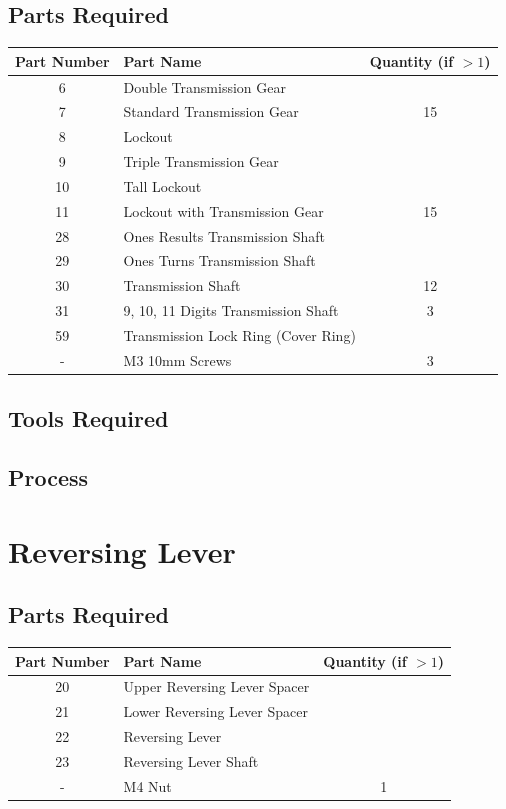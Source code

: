 \documentclass{article}
\begin{document}
\subsection{Parts Required}
\begin{table}[h!]
	\centering
	\begin{tabular}{clc}
		Part Number & Part Name & Quantity (if $>1$) \\ \hline
		6 & Double Transmission Gear &  \\
		7 & Standard Transmission Gear & 15 \\
		8 & Lockout &  \\
		9 & Triple Transmission Gear & \\
		10 & Tall Lockout & \\
		11 & Lockout with Transmission Gear & 15 \\
		28 & Ones Results Transmission Shaft & \\
		29 & Ones Turns Transmission Shaft & \\
		30 & Transmission Shaft & 12 \\
		31 & 9, 10, 11 Digits Transmission Shaft & 3 \\
		59 & Transmission Lock Ring (Cover Ring) & \\ \hline \hline
		- & M3 10mm Screws & 3
	\end{tabular}
\end{table}

\subsection{Tools Required}

\subsection{Process}


\newpage
\section{Reversing Lever}
\subsection{Parts Required}
\begin{table}[h!]
	\centering
	\begin{tabular}{clc}
		Part Number & Part Name & Quantity (if $>1$) \\ \hline
		20 & Upper Reversing Lever Spacer & \\
		21 & Lower Reversing Lever Spacer & \\
		22 & Reversing Lever & \\
		23 & Reversing Lever Shaft & \\ \hline \hline
		- & M4 Nut & 1
	\end{tabular}
\end{table}
\end{document}
